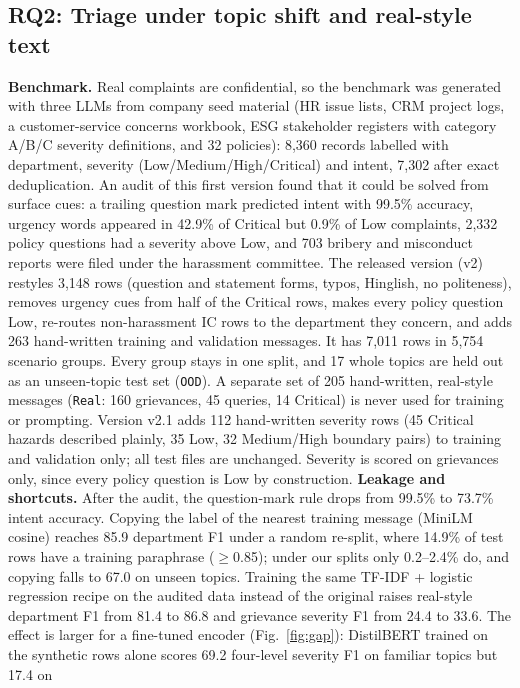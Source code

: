 \documentclass[conference]{IEEEtran}
\begin{document}
\subsection{RQ2: Triage under topic shift and real-style text}
\label{sec:bench}

\textbf{Benchmark.} Real complaints are confidential, so the benchmark was generated with three LLMs from company
seed material (HR issue lists, CRM project logs, a customer-service concerns workbook, ESG stakeholder registers
with category A/B/C severity definitions, and 32 policies): 8,360 records labelled with
department, severity (Low/Medium/High/Critical) and intent, 7,302 after exact deduplication. An audit of this first
version found that it could be solved from surface cues: a trailing question mark
predicted intent with 99.5\% accuracy, urgency words appeared in 42.9\% of Critical but 0.9\% of Low complaints,
2,332 policy questions had a severity above Low, and 703 bribery and misconduct reports were filed under the
harassment committee. The released version (v2) restyles 3,148 rows (question and statement
forms, typos, Hinglish, no politeness), removes urgency cues from half of the Critical rows, makes every policy
question Low, re-routes non-harassment IC rows to the department they concern, and adds 263 hand-written training
and validation messages. It has 7,011 rows in 5,754 scenario groups. Every group stays in one split, and 17 whole
topics are held out as an unseen-topic test set (\texttt{OOD}). A separate set of 205 hand-written, real-style
messages (\texttt{Real}: 160 grievances, 45 queries, 14 Critical) is never used for training or prompting. Version
v2.1 adds 112 hand-written severity rows (45 Critical hazards described plainly, 35 Low, 32 Medium/High boundary
pairs) to training and validation only; all test files are unchanged. Severity is scored on grievances only, since
every policy question is Low by construction.
\textbf{Leakage and shortcuts.} After the audit, the question-mark rule drops from 99.5\%
to 73.7\% intent accuracy. Copying the label of the nearest training message (MiniLM cosine) reaches 85.9
department F1 under a random re-split, where 14.9\% of test rows have a training paraphrase ($\geq$0.85); under our
splits only 0.2--2.4\% do, and copying falls to 67.0 on unseen topics. Training the same TF-IDF + logistic
regression recipe on the audited data instead of the original raises real-style department F1 from 81.4 to 86.8 and
grievance severity F1 from 24.4 to 33.6. The effect is larger for a fine-tuned encoder (Fig.~\ref{fig:gap}):
DistilBERT trained on the synthetic rows alone scores 69.2 four-level severity F1 on familiar topics but 17.4 on
\end{document}
